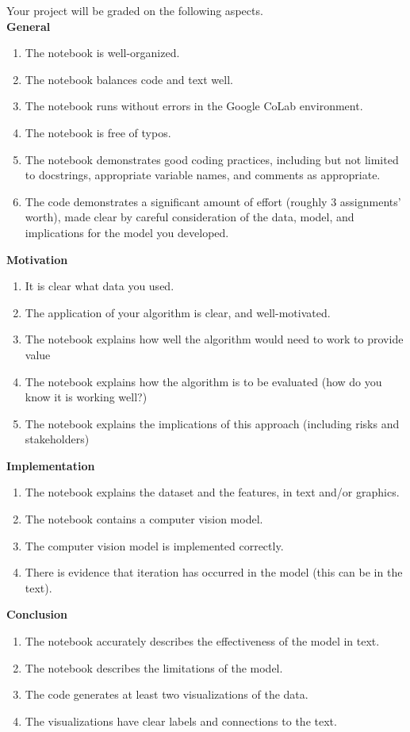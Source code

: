 \documentclass{tufte-handout}
\begin{document}
Your project will be graded on the following aspects.\\ %
\vspace{1em}
\textbf{General}
\begin{enumerate}[leftmargin=.5in]
\item The notebook is well-organized.
\item The notebook balances code and text well.
\item The notebook runs without errors in the Google CoLab environment.
\item The notebook is free of typos.
\item The notebook demonstrates good coding practices, including but not limited to docstrings, appropriate variable names, and comments as appropriate.
\item The code demonstrates a significant amount of effort (roughly 3 assignments'
  worth), made clear by careful consideration of the data, model, and implications for the model you developed.
\end{enumerate}

\textbf{Motivation}
\begin{enumerate}[resume, leftmargin=.5in]
\item It is clear what data you used.
\item The application of your algorithm is clear, and well-motivated.
\item The notebook explains how well the algorithm would need to work to provide value
\item The notebook explains how the algorithm is to be evaluated (how do you know it is working well?)
\item The notebook explains the implications of this approach (including risks and stakeholders)
\end{enumerate}

\textbf{Implementation}
\begin{enumerate}[resume, leftmargin=.5in]
\item The notebook explains the dataset and the features, in text and/or graphics.
\item The notebook contains a computer vision model.
\item The computer vision model is implemented correctly.
\item There is evidence that iteration has occurred in the model (this can be in the text).
\end{enumerate}

\textbf{Conclusion}
\begin{enumerate}[resume, leftmargin=.5in]
\item The notebook accurately describes the effectiveness of the model in text.
\item The notebook describes the limitations of the model.
\item The code generates at least two visualizations of the data.
\item The visualizations have clear labels and connections to the text.
\end{enumerate}
\end{document}
